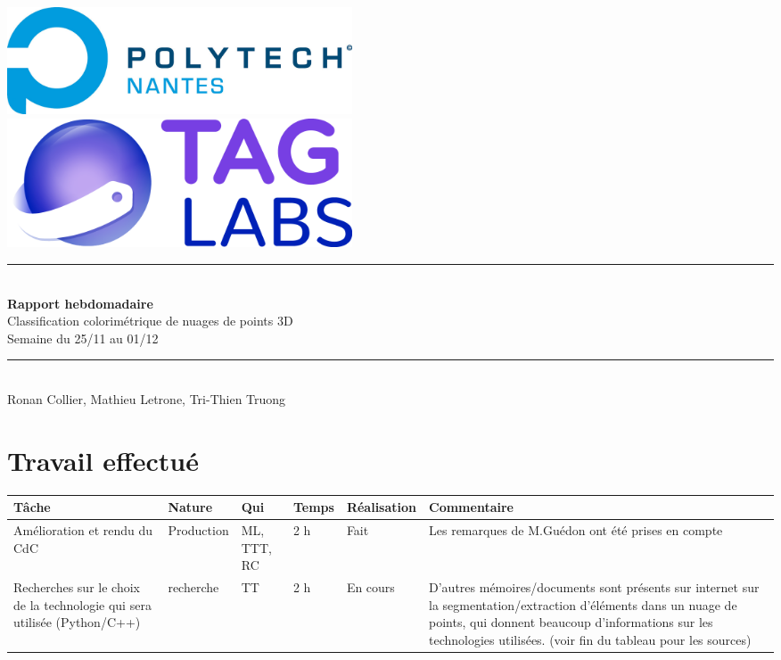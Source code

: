 \documentclass[12pt,titlepage,french]{article}
\begin{document}

\begin{titlepage}
\newcommand{\HRule}{\rule{\linewidth}{0.5mm}}
\center

  \includegraphics[width=0.45\textwidth]{img/image2.png}\\[1cm]
   
  \includegraphics[width=0.45\textwidth]{img/image1.png}


\HRule \\[0.4cm]
{ \huge \bfseries Rapport hebdomadaire\\[0.15cm] }
Classification colorimétrique de nuages de points 3D\\
Semaine du 25/11 au 01/12
\HRule \\[1.5cm]
Ronan Collier,
Mathieu Letrone,
Tri-Thien Truong
\\[1cm]
\end{titlepage}

\section{Travail effectué}

\noindent\begin{tabularx}{17cm}{|p{2.5cm}|p{2.5cm}|p{1cm}|p{1.5cm}|p{2.5cm}|X|}
    \hline
    \textbf{Tâche} & \textbf{Nature} & \textbf{Qui} & \textbf{Temps} & \textbf{Réalisation} & \textbf{Commentaire} \\
    \hline
    Amélioration et rendu du CdC & Production & ML, TTT, RC & 2 h & Fait & Les remarques de M.Guédon ont été prises en compte\\
    \hline
    Recherches sur le choix de la technologie qui sera utilisée (Python/C++) & recherche & TT & 2 h & En cours & D'autres mémoires/documents sont présents sur internet sur la segmentation/extraction d'éléments dans un nuage de points, qui donnent beaucoup d'informations sur les technologies utilisées. (voir fin du tableau pour les sources)\\
    \hline
\end{tabularx} \\
\end{document}
